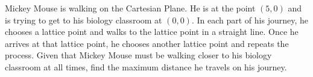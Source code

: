 Mickey Mouse is walking on the Cartesian Plane. He is at the point $(5,0)$ and is trying to get to his biology classroom at $(0,0)$. In each part of his journey, he chooses a lattice point and walks to the lattice point in a straight line. Once he arrives at that lattice point, he chooses another lattice point and repeats the process. Given that Mickey Mouse must be walking closer to his biology classroom at all times, find the maximum distance he travels on his journey.
